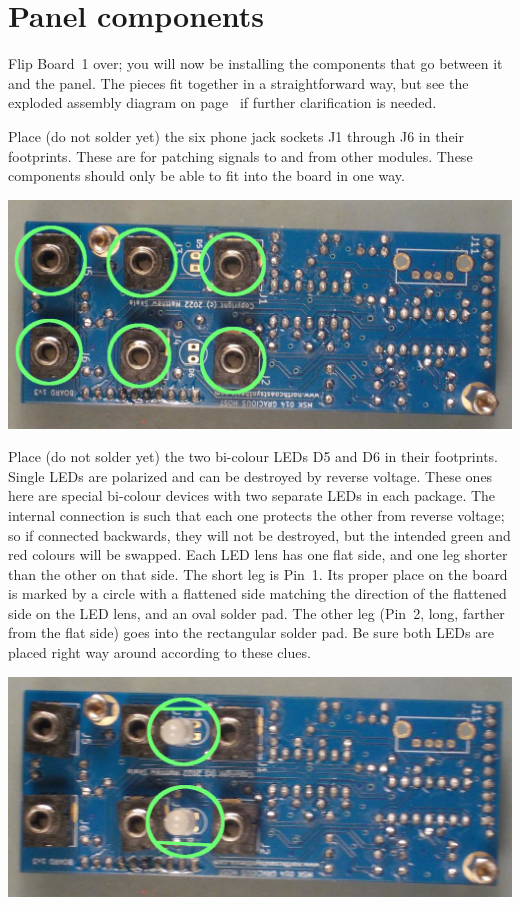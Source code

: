 \section{Panel components}

Flip Board~1 over; you will now be installing the components that go between
it and the panel.  The pieces fit together in a straightforward way, but
see the exploded assembly diagram on page~\pageref{fig:exploded} if
further clarification is needed.

Place (do not solder yet) the six phone jack sockets J1 through J6 in
their footprints.  These are for patching signals to and from other modules. 
These components should only be able to fit into the board in one way.

\nopagebreak
\noindent\includegraphics[width=\linewidth]{jack.jpg}

Place (do not solder yet) the two bi-colour LEDs D5 and D6 in their
footprints.
Single LEDs are polarized and can be destroyed by reverse
voltage.  These ones here are special bi-colour devices with two separate
LEDs in each package.  The internal connection is such that each one
protects the other from reverse voltage; so if connected backwards, they
will not be destroyed, but the intended green and red colours will be
swapped.  Each LED lens has one flat side, and one leg shorter than the
other on that side.  The short leg is Pin~1.  Its proper place on the board
is marked by a circle with a flattened side matching the direction of the
flattened side on the LED lens, and an oval solder pad.  The other leg
(Pin~2, long, farther from the flat side) goes into the rectangular solder
pad.  Be sure both LEDs are placed right way around according to these
clues.

\nopagebreak
\noindent\includegraphics[width=\linewidth]{led.jpg}

